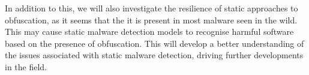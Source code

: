 \documentclass[main.tex]{subfiles}
\begin{document}
In addition to this, we will also investigate the resilience of static approaches to obfuscation, as it seems that the it is present in most malware seen in the wild. This may cause static malware detection models to recognise harmful software based on the presence of obfuscation. This will develop a better understanding of the issues associated with static malware detection, driving further developments in the field.
\end{document}
